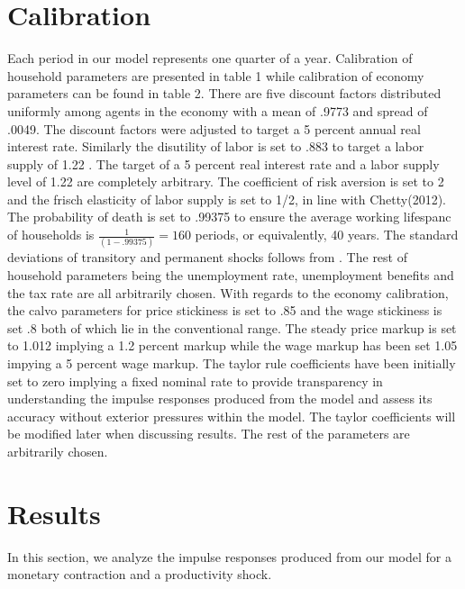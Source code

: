 \documentclass[titlepage]{\econtex}\providecommand{\texname}{BufferStockTheory}
\providecommand{\TableDir}{Tables}
\begin{document}
\hypertarget{Calibration}{}
\section{Calibration}



Each period in our model represents one quarter of a year. Calibration of household parameters are presented in table 1 while calibration of economy parameters can be found in table 2. There are five discount factors distributed uniformly among agents in the economy with a mean of .9773 and spread of .0049. The discount factors were adjusted to target a 5 percent annual real interest rate. Similarly the disutility of labor is set to .883 to target a labor supply of 1.22 . The target of a 5 percent real interest rate and a labor supply level of 1.22 are completely arbitrary.  The coefficient of risk aversion is set to 2 and the frisch elasticity of labor supply is set to 1/2, in line with Chetty(2012).  The probability of death is set to .99375 to ensure the average working lifespanc of households is $ \frac{1}{(1-.99375)} = 160$ periods, or equivalently, 40 years.  The standard deviations of transitory and permanent shocks follows from \cite{  carroll2017distribution}. The rest of household parameters being the unemployment rate, unemployment benefits and the tax rate are all arbitrarily chosen. With regards to the economy calibration, the calvo parameters for price stickiness is set to .85 and the wage stickiness is set .8 both of which lie in the conventional range. The steady price markup is set to 1.012 implying a 1.2 percent markup while the wage markup has been set 1.05 impying a 5 percent wage markup. The taylor rule coefficients have been initially set to zero implying a fixed nominal rate to provide transparency in understanding the impulse responses produced from the model and assess its accuracy without exterior pressures within the model. The taylor coefficients will be modified later when discussing results. The rest of the parameters are arbitrarily chosen. \\






\hypertarget{Results}{}
\section{Results}

In this section, we analyze the impulse responses produced from our model for a monetary contraction and a productivity shock.
\end{document}
